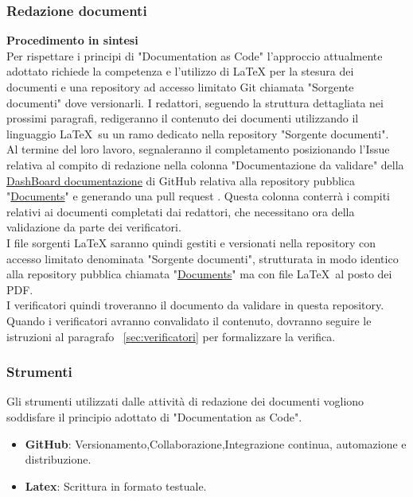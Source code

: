 \documentclass{article}
\begin{document}
\subsubsection{Redazione documenti}
\textbf{Procedimento in sintesi}\\
    Per rispettare i principi  di "Documentation as Code" l'approccio attualmente adottato richiede la competenza e l'utilizzo di LaTeX per la stesura dei documenti e una repository ad accesso limitato Git chiamata "Sorgente documenti" dove versionarli. I redattori, seguendo la struttura dettagliata nei prossimi paragrafi, redigeranno il contenuto dei documenti utilizzando il linguaggio \LaTeX\ su un ramo dedicato nella repository "Sorgente documenti". \\
    Al termine del loro lavoro, segnaleranno il completamento posizionando l'Issue relativa al compito di redazione nella colonna "Documentazione da validare" della \href{https://github.com/orgs/ByteOps-swe/projects/1/views/1}{DashBoard documentazione} di GitHub relativa alla repository pubblica "\href{https://github.com/ByteOps-swe/Documents}{Documents}" e generando una pull request . Questa colonna conterrà i compiti relativi ai documenti completati dai redattori, che necessitano ora della validazione da parte dei verificatori. \\
   
    I file sorgenti LaTeX saranno quindi gestiti e versionati nella repository con accesso limitato denominata "Sorgente documenti", strutturata in modo identico alla repository pubblica chiamata "\href{https://github.com/ByteOps-swe/Documents}{Documents}" ma con file \LaTeX\ al posto dei PDF. \\
    I verificatori quindi troveranno il documento da validare in questa repository.\\
   Quando i verificatori avranno convalidato il contenuto, dovranno seguire le istruzioni al paragrafo ~\ref{sec:verificatori} per formalizzare la verifica.
    \subsubsection{Strumenti}
    Gli strumenti utilizzati dalle attività di redazione dei documenti vogliono soddisfare il principio adottato di "Documentation as Code".
    \begin{itemize}
        \item \textbf{GitHub}: Versionamento,Collaborazione,Integrazione continua, automazione e distribuzione.
        \item \textbf{Latex}: Scrittura in formato testuale.
    \end{itemize}
\end{document}
